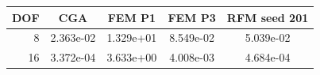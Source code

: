 \begin{tabular}{rcccc}
\toprule
DOF & CGA & FEM P1 & FEM P3 & RFM seed 201 \\
\midrule
8 & 2.363e-02 & 1.329e+01 & 8.549e-02 & 5.039e-02 \\
16 & 3.372e-04 & 3.633e+00 & 4.008e-03 & 4.684e-04 \\
\bottomrule
\end{tabular}
